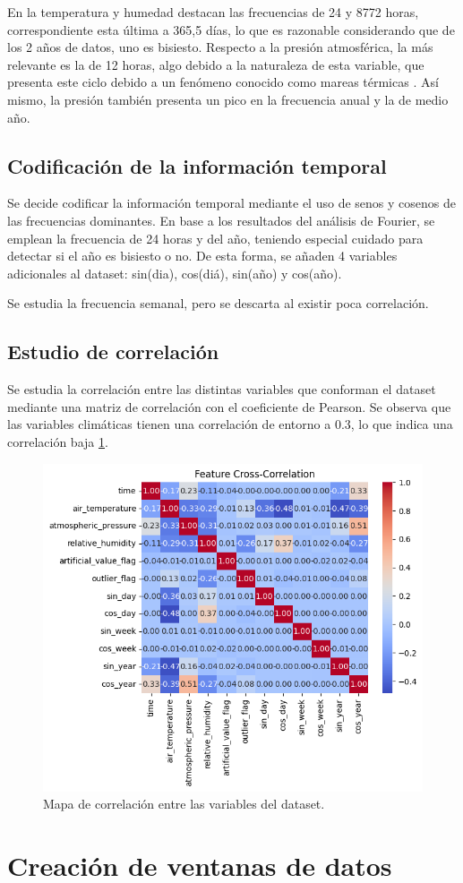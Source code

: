En la temperatura y humedad destacan las frecuencias de 24 y 8772 horas, correspondiente esta última a 365,5 días, lo que es razonable considerando que de los 
2 años de datos, uno es bisiesto. Respecto a la presión atmosférica, la más relevante es la de 12 horas, algo debido a la naturaleza de esta variable, 
que presenta este ciclo debido a un fenómeno conocido como mareas térmicas \cite{ChapmanLindzen1970}. Así mismo, la presión también presenta un pico en la frecuencia anual y la de medio año.


\subsection{Codificación de la información temporal}
Se decide codificar la información temporal mediante el uso de senos y cosenos de las frecuencias dominantes.
En base a los resultados del análisis de Fourier, se emplean la frecuencia de 24 horas y del año, teniendo especial cuidado para detectar
    si el año es bisiesto o no. De esta forma, se añaden 4 variables adicionales al dataset: sin(dia), cos(diá), sin(año) y cos(año).

Se estudia la frecuencia semanal, pero se descarta al existir poca correlación.

\subsection{Estudio de correlación}
Se estudia la correlación entre las distintas variables que conforman el dataset mediante una matriz de correlación con el coeficiente de Pearson.
Se observa que las variables climáticas tienen una correlación de entorno a 0.3, lo que indica una correlación baja \ref{correlation_map}.

\begin{figure}
    \centering
    \includegraphics[width=.5\linewidth]{images/correlation_heatmap.png}
    \caption{Mapa de correlación entre las variables del dataset.}
    \label{correlation_map}
\end{figure}

\section{Creación de ventanas de datos}



